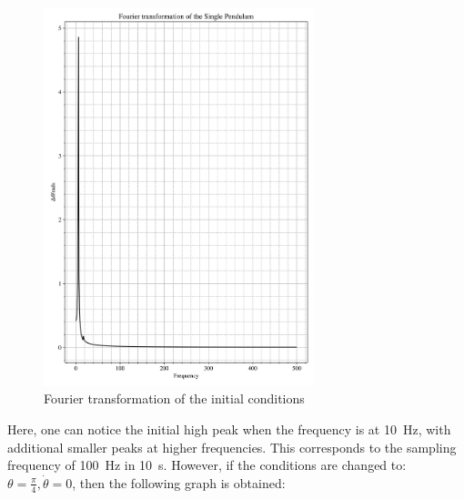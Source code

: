 \documentclass[12pt, a4paper]{article}
\begin{document}
\begin{figure}[H]
    \centering
    \includegraphics[width = 0.7\textwidth]{plots/Plot 2.1.png}\caption{Fourier transformation of the initial conditions}\label{fig: foruier 1.1}
\end{figure}

Here, one can notice the initial high peak when the frequency is at \qty{10}{\hertz}, with additional smaller peaks at higher frequencies. This corresponds to the sampling frequency of \qty{100}{\hertz} in \qty{10}{\second}. However, if the conditions are changed to: \(\theta = \frac{\pi}{4}, \dot{\theta} = 0\), then the following graph is obtained:
\end{document}
